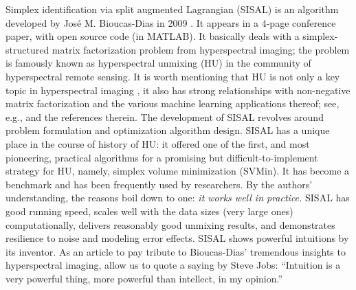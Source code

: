 \documentclass[10pt,twocolumn,twoside]{IEEEtran}
\begin{document}
{\let\thefootnote\relax{}}
{\let\thefootnote\relax{}}


Simplex identification via split augmented Lagrangian (SISAL) is an algorithm developed by Jos\'e M. Bioucas-Dias in 2009 \cite{Dias2009}.
It appears in a $4$-page conference paper, with open source code (in MATLAB).
It basically deals with a simplex-structured matrix factorization problem from  hyperspectral imaging; the problem is famously known as hyperspectral unmixing (HU) in the community of hyperspectral remote sensing.
It is worth mentioning that HU is not only a key topic in hyperspectral imaging \cite{Jose12,Ma2014HU}, it also has strong relationships with non-negative matrix factorization and the various machine learning applications thereof; see, e.g., \cite{fu2019nonnegative,gillis2021nmf} and the references therein.
The development of SISAL revolves around problem formulation and optimization algorithm design.
SISAL has a unique place in the course of history of HU:
it offered one of the first, and most pioneering, practical algorithms for a promising but difficult-to-implement strategy for HU, namely, simplex volume minimization (SVMin).
It has become a benchmark and has been frequently used by researchers.
By the authors' understanding, the reasons boil down to one: {\em it works well in practice.}
SISAL has good running speed, scales well with the data sizes (very large ones) computationally, delivers reasonably good unmixing results, and demonstrates resilience to noise and modeling error effects.
SISAL shows powerful intuitions by its inventor. As an article to pay tribute to Bioucas-Dias' tremendous insights to hyperspectral imaging, allow us to quote a saying by Steve Jobs: ``Intuition is a very powerful thing, more powerful than intellect, in my opinion.''
\end{document}

